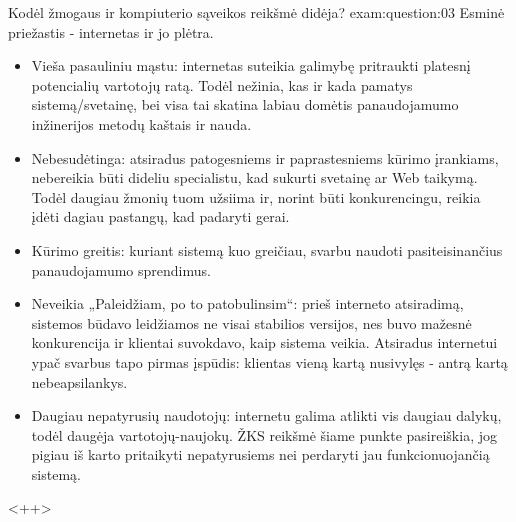 \begin{question}{%
  Kodėl žmogaus ir kompiuterio sąveikos reikšmė didėja?
  }{exam:question:03}
  Esminė priežastis - internetas ir jo plėtra. 
  \begin{itemize}
    \item{Vieša pasauliniu mąstu: internetas suteikia galimybę 
      pritraukti platesnį potencialių vartotojų ratą.
      Todėl nežinia, kas ir kada pamatys sistemą/svetainę, bei visa tai skatina labiau
      domėtis panaudojamumo inžinerijos metodų kaštais ir nauda.}
    \item{Nebesudėtinga: atsiradus patogesniems ir paprastesniems kūrimo įrankiams, 
      nebereikia būti dideliu specialistu, kad sukurti svetainę ar Web taikymą.
      Todėl daugiau žmonių tuom užsiima ir, norint būti konkurencingu, reikia įdėti 
      dagiau pastangų, kad padaryti gerai.
      }
    \item{Kūrimo greitis: kuriant sistemą kuo greičiau, svarbu naudoti pasiteisinančius
      panaudojamumo sprendimus.
      }
    \item{Neveikia „Paleidžiam, po to patobulinsim“: prieš interneto atsiradimą, sistemos 
      būdavo leidžiamos ne visai stabilios versijos, nes buvo mažesnė konkurencija ir 
      klientai suvokdavo, kaip sistema veikia. Atsiradus internetui ypač svarbus tapo 
      pirmas įspūdis: klientas vieną kartą nusivylęs - antrą kartą nebeapsilankys.
      }
    \item{Daugiau nepatyrusių naudotojų: internetu galima atlikti vis daugiau dalykų,
      todėl daugėja vartotojų-naujokų. ŽKS reikšmė šiame punkte pasireiškia, jog pigiau
      iš karto pritaikyti nepatyrusiems nei perdaryti jau funkcionuojančią sistemą.
      }
  \end{itemize}
  <++>
\end{question}

